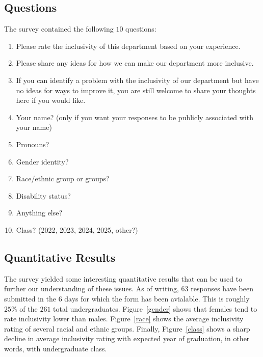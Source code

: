 \documentclass{article}
\begin{document}
\subsection{Questions}
The survey contained the following $10$ questions:
\begin{enumerate}
\item Please rate the inclusivity of this department based on your experience.	
\item Please share any ideas for how we can make our department more inclusive.	
\item If you can identify a problem with the inclusivity of our department but have no ideas for ways to improve it, you are still welcome to share your thoughts here if you would like.	
\item Your name? (only if you want your responses to be publicly associated with your name)	
\item Pronouns?	
\item Gender identity?	
\item Race/ethnic group or groups?	
\item Disability status?	
\item Anything else?	
\item Class? (2022, 2023, 2024, 2025, other?)
\end{enumerate}

\subsection{Quantitative Results}
The survey yielded some interesting quantitative results that can be 
used to further our understanding of these issues.
As of writing, $63$ responses have been submitted in the $6$ days for which the form
has been avialable.
This is roughly $25\%$ of the $261$ total undergraduates.
Figure~\ref{gender} shows that females tend to rate inclusivity lower than males.
Figure~\ref{race} shows the average inclusivity rating of several racial 
and ethnic groups.
Finally, Figure~\ref{class} shows a sharp decline in average inclusivity rating with 
expected year of graduation, in other words, with undergraduate class.
\end{document}
